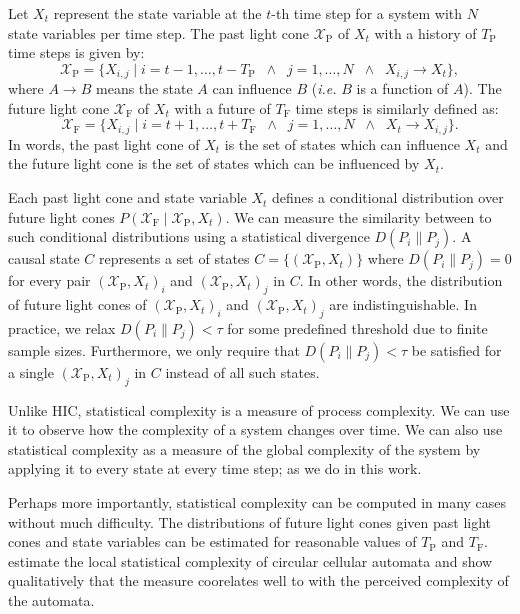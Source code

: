 Let $X_t$ represent the state variable at the $t$-th time step for a system
with $N$ state variables per time step. The past light cone
$\mathcal{X}_{\textrm{P}}$ of $X_t$ with a history of $T_{\textrm{P}}$ time
steps is given by:
\begin{equation}
    \mathcal{X}_{\textrm{P}} =
        \{X_{i, j} \mid i = t - 1, \ldots, t - T_{\textrm{P}}
            \;\;\land\;\; j = 1, \ldots, N
            \;\;\land\;\; X_{i, j} \rightarrow X_t \},
\end{equation}
where $A \rightarrow B$ means the state $A$ can influence $B$ (\emph{i.e.} $B$
is a function of $A$). The future light cone $\mathcal{X}_{\textrm{F}}$ of
$X_t$ with a future of $T_{\textrm{F}}$ time steps is similarly defined as:
\begin{equation}
    \mathcal{X}_{\textrm{F}} =
        \{X_{i, j} \mid i = t + 1, \ldots, t + T_{\textrm{F}}
            \;\;\land\;\; j = 1, \ldots, N
            \;\;\land\;\; X_t \rightarrow X_{i, j} \}.
\end{equation}
In words, the past light cone of $X_t$ is the set of states which can influence
$X_t$ and the future light cone is the set of states which can be influenced by
$X_t$.

Each past light cone and state variable $X_t$ defines a conditional
distribution over future light cones $P(\mathcal{X}_{\textrm{F}} \mid
\mathcal{X}_{\textrm{P}}, X_t)$. We can measure the similarity between to such
conditional distributions using a statistical divergence $D(P_i \| P_j)$. A
causal state $C$ represents a set of states $C = \{(\mathcal{X}_{\textrm{P}},
X_t)\}$ where $D(P_i \| P_j) = 0$ for every pair $(\mathcal{X}_{\textrm{P}},
X_t)_i$ and $(\mathcal{X}_{\textrm{P}}, X_t)_j$ in $C$. In other words, the
distribution of future light cones of $(\mathcal{X}_{\textrm{P}}, X_t)_i$ and
$(\mathcal{X}_{\textrm{P}}, X_t)_j$ are indistinguishable. In practice, we
relax $D(P_i \| P_j) < \tau$ for some predefined threshold due to finite
sample sizes. Furthermore, we only require that $D(P_i \| P_j) < \tau$ be
satisfied for a single $(\mathcal{X}_{\textrm{P}}, X_t)_j$ in $C$ instead of
all such states.

Unlike HIC, statistical complexity is a measure of process complexity. We can
use it to observe how the complexity of a system changes over time. We can also
use statistical complexity as a measure of the global complexity of the system
by applying it to every state at every time step; as we do in this work.

Perhaps more importantly, statistical complexity can be computed in many
cases without much difficulty. The distributions of future light cones given
past light cones and state variables can be estimated for reasonable values of
$T_\textrm{P}$ and $T_\textrm{F}$. \citet{shalizi2004quantifying} estimate the
local statistical complexity of circular cellular automata and show
qualitatively that the measure coorelates well to with the perceived complexity
of the automata.
